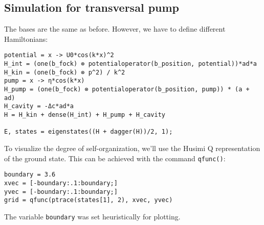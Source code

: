 \subsection{Simulation for transversal pump}

The bases are the same as before. However, we have to define different Hamiltonians:

\begin{lstlisting}
potential = x -> U0*cos(k*x)^2
H_int = (one(b_fock) ⊗ potentialoperator(b_position, potential))*ad*a
H_kin = (one(b_fock) ⊗ p^2) / k^2
pump = x -> η*cos(k*x)
H_pump = (one(b_fock) ⊗ potentialoperator(b_position, pump)) * (a + ad)
H_cavity = -Δc*ad*a
H = H_kin + dense(H_int) + H_pump + H_cavity

E, states = eigenstates((H + dagger(H))/2, 1);
\end{lstlisting} To visualize the degree of self-organization, we'll use the Husimi Q representation of the ground state. This can be achieved with the command \texttt{qfunc()}:

\begin{lstlisting}
boundary = 3.6
xvec = [-boundary:.1:boundary;]
yvec = [-boundary:.1:boundary;]
grid = qfunc(ptrace(states[1], 2), xvec, yvec)
\end{lstlisting}The variable \texttt{boundary} was set heuristically for plotting.